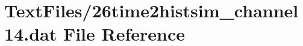 \hypertarget{26time2histsim__channel14_8dat}{}\section{Text\+Files/26time2histsim\+\_\+channel14.dat File Reference}
\label{26time2histsim__channel14_8dat}
